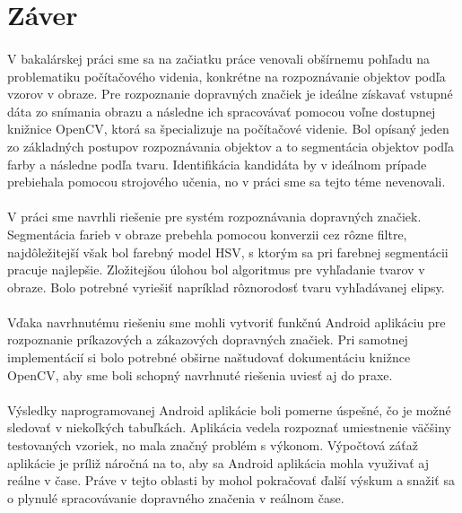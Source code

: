 \documentclass[12pt]{article}
\begin{document}
\section*{Záver}
\paragraph{}
V bakalárskej práci sme sa na začiatku práce venovali obšírnemu pohľadu na problematiku počítačového videnia, konkrétne na rozpoznávanie objektov podľa vzorov v obraze. Pre rozpoznanie dopravných značiek je ideálne získavať vstupné dáta zo snímania obrazu a následne ich spracovávať pomocou voľne dostupnej knižnice OpenCV, ktorá sa špecializuje na počítačové videnie. Bol opísaný jeden zo základných postupov rozpoznávania objektov a to segmentácia objektov podľa farby a následne podľa tvaru. Identifikácia kandidáta by v ideálnom prípade prebiehala pomocou strojového učenia, no v práci sme sa tejto téme nevenovali.
\paragraph{}
V práci sme navrhli riešenie pre systém rozpoznávania dopravných značiek. Segmentácia farieb v obraze prebehla pomocou konverzii cez rôzne filtre, najdôležitejší však bol farebný model HSV, s ktorým sa pri farebnej segmentácii pracuje najlepšie. Zložitejšou úlohou bol algoritmus pre vyhľadanie tvarov v obraze. Bolo potrebné vyriešiť napríklad rôznorodosť tvaru vyhľadávanej elipsy.
\paragraph{}
Vďaka navrhnutému riešeniu sme mohli vytvoriť funkčnú Android aplikáciu pre rozpoznanie príkazových a zákazových dopravných značiek. Pri samotnej implementácií si bolo potrebné obširne naštudovať dokumentáciu knižnce OpenCV, aby sme boli schopný navrhnuté riešenia uviesť aj do praxe.
\paragraph{}
Výsledky naprogramovanej Android aplikácie boli pomerne úspešné, čo je možné sledovať v niekoľkých tabuľkách. Aplikácia vedela rozpoznať umiestnenie väčšiny testovaných vzoriek, no mala značný problém s výkonom. Výpočtová záťaž aplikácie je príliž náročná na to, aby sa Android aplikácia mohla využivať aj reálne v čase. Práve v tejto oblasti by mohol pokračovať ďalší výskum a snažiť sa o plynulé spracovávanie dopravného značenia v reálnom čase.
\end{document}
